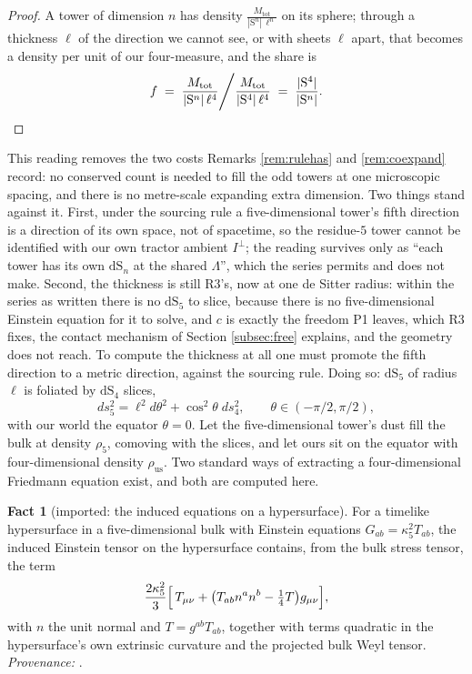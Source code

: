 \documentclass[11pt]{article}
\theoremstyle{definition}
\newtheorem{fact}[theorem]{Fact}
\newcommand{\Sph}{\mathrm{S}}
\newcommand{\dS}{\mathrm{dS}}
\begin{document}
\begin{proof}
A tower of dimension $n$ has density $\frac{M_{\mathrm{tot}}}{|\Sph^{n}|\,\ell^{n}}$ on its sphere; through a thickness $\ell$ of the direction we cannot see, or with sheets $\ell$ apart, that becomes a density per unit of our four-measure, and the share is
\[
f \;=\; \frac{M_{\mathrm{tot}}}{|\Sph^{n}|\,\ell^{4}} \Bigg/ \frac{M_{\mathrm{tot}}}{|\Sph^{4}|\,\ell^{4}} \;=\; \frac{|\Sph^{4}|}{|\Sph^{n}|} . \qedhere
\]
\end{proof}

This reading removes the two costs Remarks \ref{rem:rulehas} and \ref{rem:coexpand} record: no conserved count is needed to fill the odd towers at one microscopic spacing, and there is no metre-scale expanding extra dimension. Two things stand against it. First, under the sourcing rule a five-dimensional tower's fifth direction is a direction of its own space, not of spacetime, so the residue-$5$ tower cannot be identified with our own tractor ambient $I^{\perp}$; the reading survives only as ``each tower has its own $\dS_{n}$ at the shared $\Lambda$'', which the series permits and does not make. Second, the thickness is still R3's, now at one de Sitter radius: within the series as written there is no $\dS_{5}$ to slice, because there is no five-dimensional Einstein equation for it to solve, and $c$ is exactly the freedom P1 leaves, which R3 fixes, the contact mechanism of Section \ref{subsec:free} explains, and the geometry does not reach. To compute the thickness at all one must promote the fifth direction to a metric direction, against the sourcing rule. Doing so: $\dS_{5}$ of radius $\ell$ is foliated by $\dS_{4}$ slices,
\begin{equation}\label{eq:warp}
ds_{5}^{2} = \ell^{2}d\theta^{2} + \cos^{2}\theta\; ds_{4}^{2}, \qquad \theta \in (-\pi/2, \pi/2),
\end{equation}
with our world the equator $\theta = 0$. Let the five-dimensional tower's dust fill the bulk at density $\rho_{5}$, comoving with the slices, and let ours sit on the equator with four-dimensional density $\rho_{\mathrm{us}}$. Two standard ways of extracting a four-dimensional Friedmann equation exist, and both are computed here.

\begin{fact}[imported: the induced equations on a hypersurface]\label{fact:sms}
For a timelike hypersurface in a five-dimensional bulk with Einstein equations $G_{ab} = \kappa_{5}^{2}T_{ab}$, the induced Einstein tensor on the hypersurface contains, from the bulk stress tensor, the term
\[
\frac{2\kappa_{5}^{2}}{3}\Bigl[\,T_{\mu\nu} + \bigl(T_{ab}n^{a}n^{b} - \tfrac{1}{4}T\bigr)g_{\mu\nu}\Bigr],
\]
with $n$ the unit normal and $T = g^{ab}T_{ab}$, together with terms quadratic in the hypersurface's own extrinsic curvature and the projected bulk Weyl tensor. \emph{Provenance:} \cite[eq.~(15)]{SMS2000}.
\end{fact}
\end{document}
